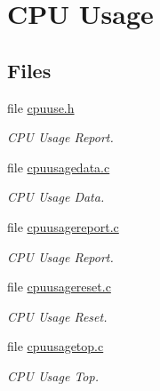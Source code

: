 \hypertarget{group__libmisc__cpuuse}{}\section{C\+PU Usage}
\label{group__libmisc__cpuuse}
\subsection*{Files}
\begin{DoxyCompactItemize}
\item 
file \mbox{\hyperlink{cpuuse_8h}{cpuuse.\+h}}
\begin{DoxyCompactList}\small\item\em C\+PU Usage Report. \end{DoxyCompactList}\item 
file \mbox{\hyperlink{cpuusagedata_8c}{cpuusagedata.\+c}}
\begin{DoxyCompactList}\small\item\em C\+PU Usage Data. \end{DoxyCompactList}\item 
file \mbox{\hyperlink{cpuusagereport_8c}{cpuusagereport.\+c}}
\begin{DoxyCompactList}\small\item\em C\+PU Usage Report. \end{DoxyCompactList}\item 
file \mbox{\hyperlink{cpuusagereset_8c}{cpuusagereset.\+c}}
\begin{DoxyCompactList}\small\item\em C\+PU Usage Reset. \end{DoxyCompactList}\item 
file \mbox{\hyperlink{cpuusagetop_8c}{cpuusagetop.\+c}}
\begin{DoxyCompactList}\small\item\em C\+PU Usage Top. \end{DoxyCompactList}\end{DoxyCompactItemize}
